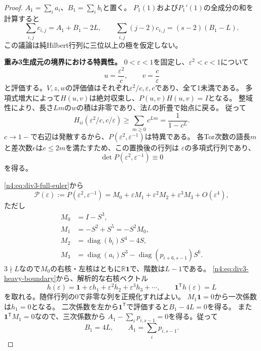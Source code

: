 \documentclass[11pt,a4paper]{ltjsarticle}
\theoremstyle{definition}
\begin{document}
\begin{proof}
$A_1=\sum_i a_i$、$B_1=\sum_i b_i$と置く。
$P_1(1)$および$P_1'(1)$の全成分の和を計算すると
\begin{equation}\label{n4:eq:div3-mixed-moments}
 \sum_{i,j}c_{i,j}=A_1+B_1-2L,\qquad
 \sum_{i,j}(j-2)c_{i,j}=(s-2)(B_1-L).
\end{equation}
この議論は純Hilbert行列に三位以上の極を仮定しない。

\par\smallskip\noindent\textbf{重み3生成元の境界における特異性。}\quad
$0<\varepsilon<1$を固定し、$\varepsilon^2<c<1$について
\[
 u=\frac{\varepsilon^2}{c},\qquad v=\frac{c}{\varepsilon}
\]
と評価する。$V,z,w$の評価値はそれぞれ$\varepsilon^2/c,\varepsilon,c$であり、全て1未満である。
多項式増大によって$H(u,v)$は絶対収束し、$P(u,v)H(u,v)=I$となる。
整域性により、長さ$Lm$の$w$の積は非零であり、法$L$の折畳で始点に戻る。
従って
\[
 H_{ii}(\varepsilon^2/c,c/\varepsilon)
 \ge\sum_{m\ge0}c^{Lm}=\frac1{1-c^L}.
\]
$c\to1-$で右辺は発散するから、$P(\varepsilon^2,\varepsilon^{-1})$は特異である。
各Tor次数の語長$m$と差次数$e$は$e\le2m$を満たすため、この置換後の行列は
$\varepsilon$の多項式行列であり、
\begin{equation}\label{n4:eq:div3-heavy-boundary}
 \det P(\varepsilon^2,\varepsilon^{-1})\equiv0
\end{equation}
を得る。

\eqref{n4:eq:div3-full-euler}から
\[
 \mathscr P(\varepsilon):=P(\varepsilon^2,\varepsilon^{-1})
 =M_0+\varepsilon M_1+\varepsilon^2M_2+\varepsilon^3M_3+O(\varepsilon^4),
\]
ただし
\begin{align*}
 M_0&=I-S^3,\\
 M_1&=-S^2+S^5=-S^2M_0,\\
 M_2&=\operatorname{diag}(b_i)S^4-4S,\\
 M_3&=\operatorname{diag}(a_i)S^3
       -\operatorname{diag}(p_{i+6,s-1})S^6.
\end{align*}
$3\nmid L$なので$M_0$の右核・左核はともに$\mathbb R\boldsymbol1$で、階数は$L-1$である。
\eqref{n4:eq:div3-heavy-boundary}から、解析的な右核ベクトル
\[
 h(\varepsilon)=\boldsymbol1+\varepsilon h_1+
 \varepsilon^2h_2+\varepsilon^3h_3+\cdots,
 \qquad \boldsymbol1^{\mathsf T}h(\varepsilon)=L
\]
を取れる。随伴行列の0で非零な列を正規化すればよい。
$M_1\boldsymbol1=0$から一次係数は$h_1=0$となる。
二次係数を左から$\boldsymbol1^{\mathsf T}$で評価すると$B_1-4L=0$を得る。
また$\boldsymbol1^{\mathsf T}M_1=0$なので、三次係数から
$A_1-\sum_i p_{i,s-1}=0$を得る。従って
\begin{equation}\label{n4:eq:div3-heavy-moments}
 B_1=4L,\qquad A_1=\sum_i p_{i,s-1}.
\end{equation}


\end{proof}
\end{document}

